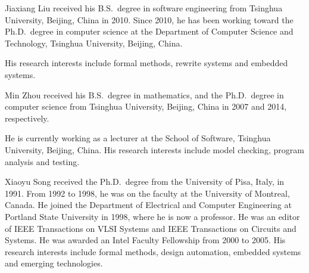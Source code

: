 \documentclass[12pt,onecolumn]{IEEEtranTIE}
\begin{document}

\begin{IEEEbiography}%
{Jiaxiang Liu} received his B.S.\ degree in software engineering from
Tsinghua University, Beijing, China in 2010. Since 2010, he has been
working toward the Ph.D.\ degree in computer science at the Department
of Computer Science and Technology, Tsinghua University, Beijing,
China.

His research interests include formal methods, rewrite systems and
embedded systems.
\end{IEEEbiography}

\begin{IEEEbiography}%
{Min Zhou} received his B.S.\ degree in mathematics, and the
Ph.D.\ degree in computer science from Tsinghua University, Beijing,
China in 2007 and 2014, respectively.

He is currently working as a lecturer at the School of Software,
Tsinghua University, Beijing, China. His research interests include
model checking, program analysis and testing.
\end{IEEEbiography}

\begin{IEEEbiography}%
{Xiaoyu Song} received the Ph.D.\ degree from the University of Pisa,
Italy, in 1991. From 1992 to 1998, he was on the faculty at the
University of Montreal, Canada. He joined the Department of Electrical
and Computer Engineering at Portland State University in 1998, where
he is now a professor. He was an editor of IEEE Transactions on VLSI
Systems and IEEE Transactions on Circuits and Systems. He was awarded
an Intel Faculty Fellowship from 2000 to 2005. His research interests
include formal methods, design automation, embedded systems and
emerging technologies.
\end{IEEEbiography}
\end{document}
